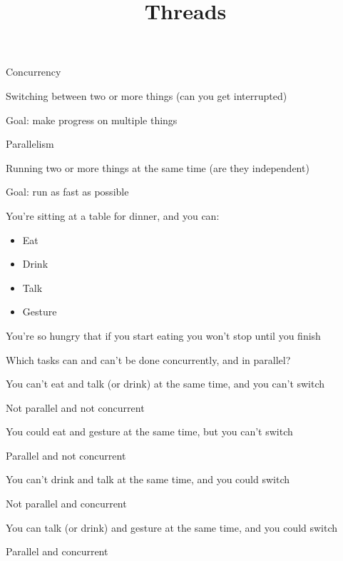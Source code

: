 

\title{Threads}


  \begin{frame}
    \titlepage
  \end{frame}

  \begin{slide}


    Concurrency

    \leftspace{}Switching between two or more things (can you get interrupted)

    \leftspace{}\leftspace{}Goal: make progress on multiple things
    \medskip

    Parallelism

    \leftspace{}Running two or more things at the same time (are they independent)

    \leftspace{}\leftspace{}Goal: run as fast as possible

  \end{slide}

  \begin{slide}


    You're sitting at a table for dinner, and you can:

    \begin{itemize}
      \item Eat
      \item Drink
      \item Talk
      \item Gesture
    \end{itemize}
    You're so hungry that if you start eating you won't stop until you finish
    \medskip

    Which tasks can and can't be done concurrently, and in parallel?

  \end{slide}

  \begin{slide}


    You can't eat and talk (or drink) at the same time, and you can't switch

    \leftspace{}Not parallel and not concurrent
    \medskip

    You could eat and gesture at the same time, but you can't switch

    \leftspace{}Parallel and not concurrent
    \medskip

    You can't drink and talk at the same time, and you could switch

    \leftspace{}Not parallel and concurrent
    \medskip

    You can talk (or drink) and gesture at the same time, and you could switch

    \leftspace{}Parallel and concurrent

  \end{slide}

